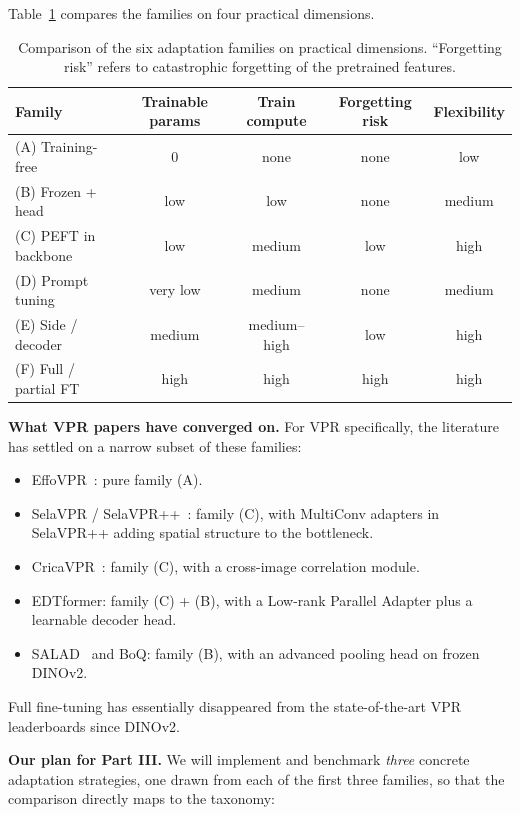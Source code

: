 \documentclass[11pt,a4paper]{article}
\begin{document}
Table~\ref{tab:adapt-compare} compares the families on four practical
dimensions.

\begin{table}[H]
\centering\small
\caption{Comparison of the six adaptation families on practical
dimensions. ``Forgetting risk'' refers to catastrophic forgetting of the
pretrained features.}
\label{tab:adapt-compare}
\begin{tabular}{@{}lcccc@{}}
\toprule
Family & Trainable params & Train compute & Forgetting risk & Flexibility \\
\midrule
(A) Training-free         & 0         & none        & none    & low   \\
(B) Frozen + head         & low       & low         & none    & medium\\
(C) PEFT in backbone      & low       & medium      & low     & high  \\
(D) Prompt tuning         & very low  & medium      & none    & medium\\
(E) Side / decoder        & medium    & medium--high& low     & high  \\
(F) Full / partial FT     & high      & high        & high    & high  \\
\bottomrule
\end{tabular}
\end{table}

\textbf{What VPR papers have converged on.} For VPR specifically, the
literature has settled on a narrow subset of these families:
\begin{itemize}[leftmargin=*]
  \item EffoVPR~\citep{tzachor2024effovpr}: pure family (A).
  \item SelaVPR / SelaVPR++~\citep{lu2024selavpr, lu2025selavprpp}:
  family (C), with MultiConv adapters in SelaVPR++ adding spatial
  structure to the bottleneck.
  \item CricaVPR~\citep{lu2024cricavpr}: family (C), with a cross-image
  correlation module.
  \item EDTformer: family (C) + (B), with a Low-rank Parallel Adapter
  plus a learnable decoder head.
  \item SALAD~\citep{izquierdo2024optimal} and BoQ: family (B), with
  an advanced pooling head on frozen DINOv2.
\end{itemize}

Full fine-tuning has essentially disappeared from the state-of-the-art
VPR leaderboards since DINOv2.

\textbf{Our plan for Part III.} We will implement and benchmark
\emph{three} concrete adaptation strategies, one drawn from each of the
first three families, so that the comparison directly maps to the
taxonomy:
\end{document}
